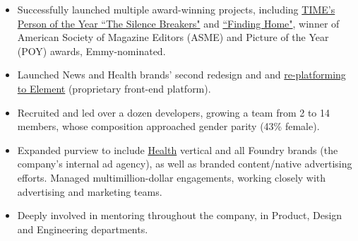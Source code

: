 \documentclass[a4paper,10pt]{memoir} %
\begin{document}
\userinformation %

\framebreak %









\begin{itemize}
	\item Successfully launched multiple award-winning projects, including  \href{http://time.com/time-person-of-the-year-2017-silence-breakers/}{TIME's Person of the Year ``The Silence Breakers"} and \href{http://time.com/finding-home/}{``Finding Home"}, winner of American Society of Magazine Editors (ASME) and Picture of the Year (POY) awards, Emmy-nominated.
	\item Launched News and Health brands' second redesign and and \href{https://medium.com/@acharalambides/element-the-digital-unification-of-time-inc-979656149fd3}{re-platforming to Element} (proprietary front-end platform).
	\item Recruited and led over a dozen developers, growing a team from 2 to 14 members, whose composition approached gender parity (43\% female).
	\item Expanded purview to include \href{http://www.health.com}{Health} vertical and all Foundry brands (the company's internal ad agency), as well as branded content/native advertising efforts. Managed multimillion-dollar engagements, working closely with advertising and marketing teams.
	\item Deeply involved in mentoring throughout the company, in Product, Design and Engineering departments. 
\end{itemize}
\Sep %
\end{document}
